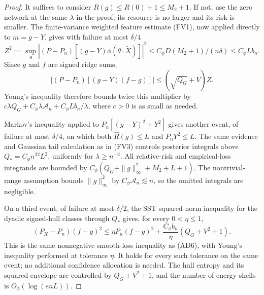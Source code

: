 \begin{proof}
It suffices to consider $R(g)\le R(0)+1\le M_2+1$.
If not, use the zero network at the same $\lambda$ in the proof;
its resource is no larger and its risk is smaller.
The finite-variance weighted feature estimate (FV1), now applied directly
to $m=g-Y$, gives with failure at most $\delta/4$
\[
 Z^2:=\sup_\theta|(P-P_n)[(g-Y)\phi(\theta\cdot\widetilde X)]|^2
 \le C_\phi D(M_2+1)/(n\delta)\le C_\phi L b_n.         \tag{AW5}
\]
Since $g$ and $f$ are signed ridge sums,
\[
 |(P-P_n)[(g-Y)(f-g)]|\le(\sqrt{Q_G}+V)Z.
\]
Young's inequality therefore bounds twice this multiplier by
$c\lambda Q_G+C_\phi\lambda\mathcal A_n+C_\phi Lb_n/\lambda$, where
$c>0$ is as small as needed.

Markov's inequality applied to
$P_n[(g-Y)^2+Y^2]$ gives another event, of failure at most $\delta/4$,
on which both $\widehat R(g)\le L$ and $P_nY^2\le L$.
The same evidence and Gaussian tail calculation as in (FV3) controls
posterior integrals above $Q_*=C_\phi n^{22}L^2$, uniformly for
$\lambda\ge n^{-2}$. All relative-risk and empirical-loss integrands
are bounded by $C_\phi(Q_G+\|g\|_\infty^2+M_2+L+1)$.
The nontrivial-range assumption bounds $\|g\|_\infty^2$ by
$C_\phi\mathcal A_n\lesssim n$, so the omitted integrals are negligible.

On a third event, of failure at most $\delta/2$, the SST squared-norm
inequality for the dyadic signed-hull classes through $Q_*$ gives,
for every $0<\eta\le1$,
\[
 (P_X-P_n)(f-g)^2
 \le\eta P_n(f-g)^2+\frac{C_\phi b_n}{\eta}(Q_G+V^2+1).
                                                               \tag{AW6}
\]
This is the same nonnegative smooth-loss inequality as (AD6), with
Young's inequality performed at tolerance $\eta$. It holds for every
such tolerance on the same event; no additional confidence allocation
is needed. The hull entropy and its squared envelope are controlled
by $Q_G+V^2+1$, and the number of energy shells is $O_\phi(\log(e nL))$.


\end{proof}
